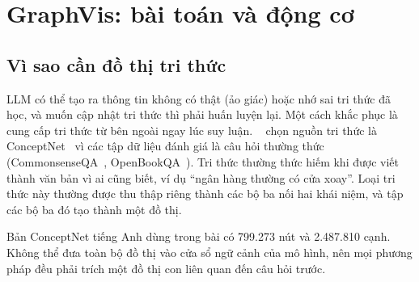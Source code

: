 
\section{GraphVis: bài toán và động cơ}\label{sec:gv-problem}

\subsection{Vì sao cần đồ thị tri thức}
LLM có thể tạo ra thông tin không có thật (ảo giác) hoặc nhớ sai tri thức đã học, và muốn cập nhật tri thức thì phải huấn luyện lại. Một cách khắc phục là cung cấp tri thức từ bên ngoài ngay lúc suy luận. \GV{}~\cite{deng2024graphvis} chọn nguồn tri thức là ConceptNet~\cite{speer2017conceptnet} vì các tập dữ liệu đánh giá là câu hỏi thường thức (CommonsenseQA~\cite{talmor2019csqa}, OpenBookQA~\cite{mihaylov2018obqa}). Tri thức thường thức hiếm khi được viết thành văn bản vì ai cũng biết, ví dụ ``ngân hàng thường có cửa xoay''. Loại tri thức này thường được thu thập riêng thành các bộ ba nối hai khái niệm, và tập các bộ ba đó tạo thành một đồ thị.

Bản ConceptNet tiếng Anh dùng trong bài có 799.273 nút và 2.487.810 cạnh. Không thể đưa toàn bộ đồ thị vào cửa sổ ngữ cảnh của mô hình, nên mọi phương pháp đều phải trích một đồ thị con liên quan đến câu hỏi trước.

